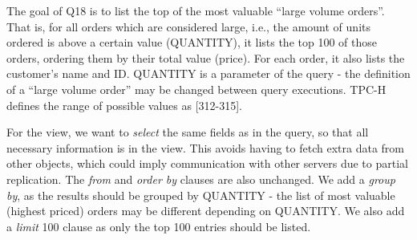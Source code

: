 \documentclass[sigplan,review,anonymous]{acmart}
\begin{document}

The goal of Q18 is to list the top of the most valuable ``large volume orders''.
That is, for all orders which are considered large, i.e., the amount of units ordered is above a certain value (QUANTITY), it lists the top 100 of those orders, ordering them by their total value (price).
For each order, it also lists the customer's name and ID.
QUANTITY is a parameter of the query - the definition of a ``large volume order'' may be changed between query executions.
TPC-H defines the range of possible values as [312-315].	%

For the view, we want to \emph{select} the same fields as in the query, so that all necessary information is in the view.
This avoids having to fetch extra data from other objects, which could imply communication with other servers due to partial replication.
The \emph{from} and \emph{order by} clauses are also unchanged. %
We add a \emph{group by}, as the results should be grouped by QUANTITY - the list of most valuable (highest priced) orders may be different depending on QUANTITY. %
We also add a \emph{limit} 100 clause as only the top 100 entries should be listed.
\end{document}

